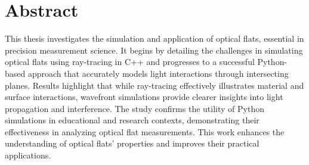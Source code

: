 \documentclass[../main.tex]{subfiles}
\begin{document}
    \chapter{Abstract}
    This thesis investigates the simulation and application of optical flats, essential in precision measurement science. It begins by detailing the challenges in simulating optical flats using ray-tracing in C++ and progresses to a successful Python-based approach that accurately models light interactions through intersecting planes. Results highlight that while ray-tracing effectively illustrates material and surface interactions, wavefront simulations provide clearer insights into light propagation and interference. The study confirms the utility of Python simulations in educational and research contexts, demonstrating their effectiveness in analyzing optical flat measurements. This work enhances the understanding of optical flats' properties and improves their practical applications.
\end{document}
